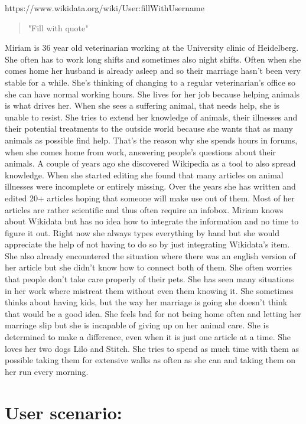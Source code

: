 \documentclass{article}
\begin{document}
\pagebreak

https://www.wikidata.org/wiki/User:fillWithUsername
\begin{quote}
"Fill with quote"
\end{quote}

Miriam is 36 year old veterinarian working at the University clinic of Heidelberg. She often has to work long shifts and sometimes also night shifts. Often when she comes home her husband is already asleep and so their marriage hasn't been very stable for a while. She's thinking of changing to a regular veterinarian's office so she can have normal working hours. She lives for her job because helping animals is what drives her. When she sees a suffering animal, that needs help, she is unable to resist. She tries to extend her knowledge of animals, their illnesses and their potential treatments to the outside world because she wants that as many animals as possible find help. That's the reason why she spends hours in forums, when she comes home from work, answering people's questions about their animals. A couple of years ago she discovered Wikipedia as a tool to also spread knowledge. When she started editing she found that many articles on animal illnesses were incomplete or entirely missing. Over the years she has written and edited 20+ articles hoping that someone will make use out of them. Most of her articles are rather scientific and thus often require an infobox. Miriam knows about Wikidata but has no idea how to integrate the information and no time to figure it out. Right now she always types everything by hand but she would appreciate the help of not having to do so by just integrating Wikidata's item. She also already encountered the situation where there was an english version of her article but she didn't know how to connect both of them. She often worries that people don't take care properly of their pets. She has seen many situations in her work where mistreat them without even them knowing it. 
She sometimes thinks about having kids, but the way her marriage is going she doesn't think that would be a good idea. She feels bad for not being home often and letting her marriage slip but she is incapable of giving up on her animal care. She is determined to make a difference, even when it is just one article at a time.
She loves her two dogs Lilo and Stitch. She tries to spend as much time with them as possible taking them for extensive walks as often as she can and taking them on her run every morning. 

\section{User scenario:}
\end{document}
